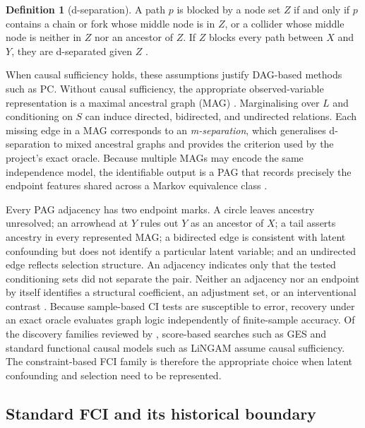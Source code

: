 \documentclass[11pt,a4paper]{article}
\theoremstyle{definition}
\newtheorem{definition}{Definition}
\begin{document}
\begin{definition}[d-separation]
A path \(p\) is blocked by a node set \(Z\) if and only if \(p\) contains a
chain or fork whose middle node is in \(Z\), or a collider whose middle node
is neither in \(Z\) nor an ancestor of \(Z\). If \(Z\) blocks every path
between \(X\) and \(Y\), they are d-separated given \(Z\)
\citep{pearl2009causality}.
\end{definition}

When causal sufficiency holds, these assumptions justify DAG-based methods
such as PC. Without causal sufficiency, the appropriate observed-variable
representation is a maximal ancestral graph (MAG)
\citep{richardson2002ancestral}. Marginalising over \(L\) and conditioning on
\(S\) can induce directed, bidirected, and undirected relations. Each missing
edge in a MAG corresponds to an \emph{m-separation}, which generalises
d-separation to mixed ancestral graphs and provides the criterion used by the
project's exact oracle. Because multiple MAGs may encode the same independence
model, the identifiable output is a PAG that records precisely the endpoint
features shared across a Markov equivalence class
\citep{zhang2008completeness}.

Every PAG adjacency has two endpoint marks. A circle leaves ancestry
unresolved; an arrowhead at \(Y\) rules out \(Y\) as an ancestor of \(X\); a
tail asserts ancestry in every represented MAG; a bidirected edge is
consistent with latent confounding but does not identify a particular latent
variable; and an undirected edge reflects selection structure. An adjacency
indicates only that the tested conditioning sets did not separate the pair.
Neither an adjacency nor an endpoint by itself identifies a structural
coefficient, an adjustment set, or an interventional contrast
\citep{pearl2009causality}. Because sample-based CI tests are susceptible to
error, recovery under an exact oracle evaluates graph logic independently of
finite-sample accuracy. Of the discovery families reviewed by
\citet{glymour2019review}, score-based searches such as GES and standard
functional causal models such as LiNGAM assume causal sufficiency. The
constraint-based FCI family is therefore the appropriate choice when latent
confounding and selection need to be represented.

\subsection{Standard FCI and its historical boundary}
\end{document}
